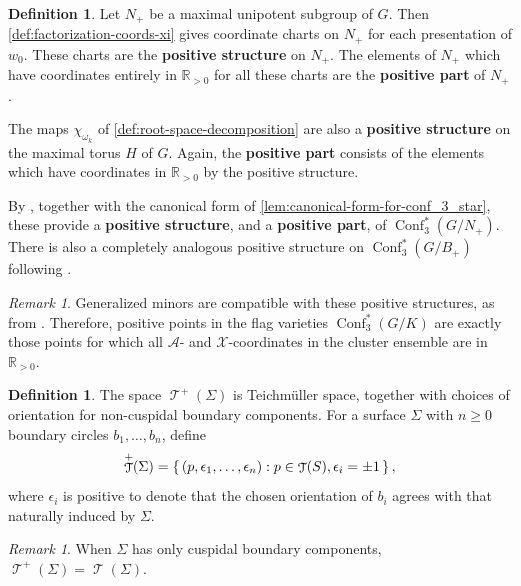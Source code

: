 \documentclass{amsart}
\theoremstyle{plain}
\theoremstyle{definition}
\newtheorem{definition}[theorem]{Definition}
\theoremstyle{remark}
\newtheorem{remark}[theorem]{Remark}
\newcommand{\defined}[1]{\textbf{#1}}
\newcommand{\fundamentalweight}{\omega}
\DeclareMathOperator{\Conf}{Conf}
\DeclareMathOperator{\teich}{\mathcal{T}}
\begin{document}
  \begin{definition}
    \label{def:positive-structure}
    Let $N_{+}$ be a maximal unipotent subgroup of $G$. Then
    \cref{def:factorization-coords-xi} gives coordinate charts on
    $N_{+}$ for each presentation of $w_0$. These charts are the
    \defined{positive structure} on $N_{+}$. The elements of $N_{+}$
    which have coordinates entirely in $\mathbb{R}_{>0}$ for all these
    charts are the \defined{positive part} of $N_{+}$.

    The maps $\chi_{\fundamentalweight_k}$ of
    \cref{def:root-space-decomposition} are also a \defined{positive
      structure} on the maximal torus $H$ of $G$. Again, the
    \defined{positive part} consists of the elements which have
    coordinates in $\mathbb{R}_{>0}$ by the positive structure.

    By \cite[Section~8.1]{fockgoncharov2006}, together with the
    canonical form of \cref{lem:canonical-form-for-conf_3_star}, these
    provide a \defined{positive structure}, and a \defined{positive
      part}, of $\Conf_3^{\ast}(G/N_{+})$. There is also a completely
    analogous positive structure on $\Conf_3^{\ast}(G/B_{+})$ following
    \cite[Section~5.5]{fockgoncharov2006}.
  \end{definition}

  \begin{remark}
    Generalized minors are compatible with these positive structures, as
    from \cite[Theorem~5.1]{fockgoncharov2006}. Therefore, positive
    points in the flag varieties $\Conf_3^{\ast}(G/K)$ are exactly those
    points for which all $\mathcal{A}$- and $\mathcal{X}$-coordinates in
    the cluster ensemble are in $\mathbb{R}_{>0}$.
  \end{remark}

  \begin{definition}
    \label{def:teich-plus}
    The space $\teich^{+}(\Sigma)$ is Teichmüller space, together with
    choices of orientation for non-cuspidal boundary components. For a
    surface $\Sigma$ with $n \ge 0$ boundary circles $b_1, \dotsc, b_n$,
    define \[ \teich^{+}(\Sigma) = \set{(p, \epsilon_1, \dotsc,
        \epsilon_n) : p \in \teich(S), \epsilon_i = \pm 1}, \] where
    $\epsilon_i$ is positive to denote that the chosen orientation of
    $b_i$ agrees with that naturally induced by $\Sigma$.
  \end{definition}

  \begin{remark}
    When $\Sigma$ has only cuspidal boundary components,
    $\teich^{+}(\Sigma) = \teich(\Sigma)$.
  \end{remark}
\end{document}
